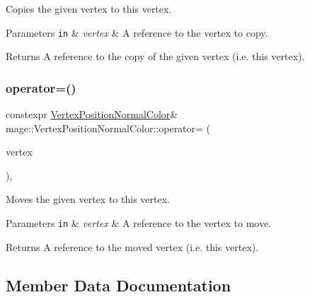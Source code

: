 Copies the given vertex to this vertex.


\begin{DoxyParams}[1]{Parameters}
\mbox{\tt in}  & {\em vertex} & A reference to the vertex to copy. \\
\hline
\end{DoxyParams}
\begin{DoxyReturn}{Returns}
A reference to the copy of the given vertex (i.\+e. this vertex). 
\end{DoxyReturn}
\hypertarget{structmage_1_1_vertex_position_normal_color_a05270c6feff508dced4d82cda4fda0f6}{}\label{structmage_1_1_vertex_position_normal_color_a05270c6feff508dced4d82cda4fda0f6} 
\subsubsection{\texorpdfstring{operator=()}{operator=()}\hspace{0.1cm}{\footnotesize\ttfamily [2/2]}}
{\footnotesize\ttfamily constexpr \hyperlink{structmage_1_1_vertex_position_normal_color}{Vertex\+Position\+Normal\+Color}\& mage\+::\+Vertex\+Position\+Normal\+Color\+::operator= (\begin{DoxyParamCaption}\item[{\hyperlink{structmage_1_1_vertex_position_normal_color}{Vertex\+Position\+Normal\+Color} \&\&}]{vertex }\end{DoxyParamCaption})\hspace{0.3cm}{\ttfamily [default]}, {\ttfamily [noexcept]}}

Moves the given vertex to this vertex.


\begin{DoxyParams}[1]{Parameters}
\mbox{\tt in}  & {\em vertex} & A reference to the vertex to move. \\
\hline
\end{DoxyParams}
\begin{DoxyReturn}{Returns}
A reference to the moved vertex (i.\+e. this vertex). 
\end{DoxyReturn}


\subsection{Member Data Documentation}
\hypertarget{structmage_1_1_vertex_position_normal_color_a7d294a529c50b10832436dc456433a71}{}\label{structmage_1_1_vertex_position_normal_color_a7d294a529c50b10832436dc456433a71} 
